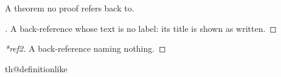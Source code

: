 \begin{theorem}\flmLabels{\label{ref1}}
A theorem no proof refers back to.
\end{theorem}

\begin{proof}[{}]
A back-reference whose text is no label: its title is shown as written.
\end{proof}

\begin{proof}[*ref2]
A back-reference naming nothing.
\end{proof}%
\RequirePackage[thmset=empty]{phfthm}
\RequirePackage{zref-clever}
\ProvideDocumentCommand\noproofref{}{}
\ifcsname th@definitionlike\endcsname\else{}\fi
\ProvideDocumentCommand{}
